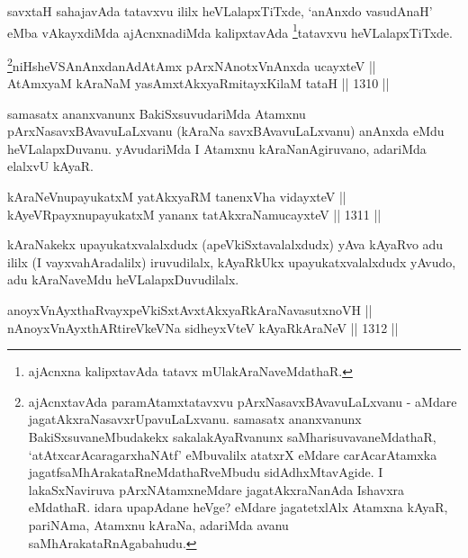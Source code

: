 \begin{artha}
savxtaH sahajavAda tatavxvu ililx heVLalapxTiTxde, `anAnxdo vasudAnaH' eMba vAkayxdiMda ajAcnxnadiMda kalipxtavAda \footnote{ajAcnxna kalipxtavAda tatavx mUlakAraNaveMdathaR.}tatavxvu heVLalapxTiTxde.
\end{artha}



\begin{shl}
\footnote{ajAcnxtavAda paramAtamxtatavxvu pArxNasavxBAvavuLaLxvanu - aMdare jagatAkxraNasavxrUpavuLaLxvanu. samasatx ananxvanunx BakiSxsuvaneMbudakekx sakalakAyaRvanunx saMharisuvavaneMdathaR, `atAtxcarAcaragarxhaNAtf' eMbuvalilx atatxrX eMdare carAcarAtamxka jagatfsaMhArakataRneMdathaRveMbudu sidAdhxMtavAgide. I lakaSxNaviruva pArxNAtamxneMdare jagatAkxraNanAda Ishavxra eMdathaR. idara upapAdane heVge? eMdare jagatetxlAlx Atamxna kAyaR, pariNAma, Atamxnu kAraNa, adariMda avanu saMhArakataRnAgabahudu.}niHsheVSAnAnxdanAdAtAmx pArxNAnotxV\s nAnxda ucayxteV || \\
AtAmx\s yaM kAraNaM yasAmxtAkxyaRmitayxKilaM tataH \hfill || 1310 ||  
\end{shl}

\begin{artha}
samasatx ananxvanunx BakiSxsuvudariMda Atamxnu pArxNasavxBAvavuLaLxvanu (kAraNa savxBAvavuLaLxvanu) anAnxda eMdu heVLalapxDuvanu. yAvudariMda I Atamxnu kAraNanAgiruvano, adariMda elalxvU kAyaR.
\end{artha}

\begin{shl}
kAraNeV\s nupayukatxM yatAkxyaRM tanenxVha vidayxteV || \\
kAyeVR\s payxnupayukatxM yananx tatAkxraNamucayxteV \hfill || 1311 ||  
\end{shl}

\begin{artha}
kAraNakekx upayukatxvalalxdudx (apeVkiSxtavalalxdudx) yAva kAyaRvo adu ililx (I vayxvahAradalilx) iruvudilalx, kAyaRkUkx upayukatxvalalxdudx yAvudo, adu kAraNaveMdu heVLalapxDuvudilalx.
\end{artha}


\begin{shl}
anoyxVnAyxthaRvayxpeVkiSxtAvxtAkxyaRkAraNavasutxnoVH || \\
nAnoyxVnAyxthARtireVkeVNa sidheyxVteV kAyaRkAraNeV \hfill || 1312 ||  
\end{shl}

